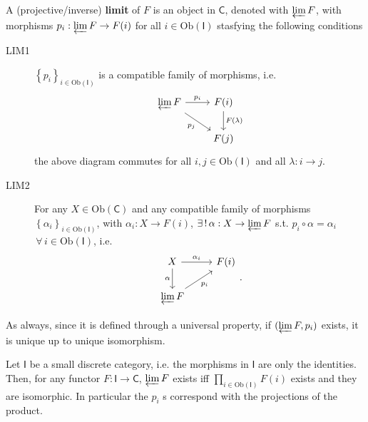 \begin{defn}
	A (projective/inverse) \textbf{limit} of $F$ is an object in $\mathsf{C}$, denoted with $\varprojlim F$, with morphisms
	$p_i: \varprojlim F \to F(i)$ for all $i \in \mathrm{Ob} \left(\mathsf{I}\right)$ stasfying the following conditions
	\begin{description}
		\item[LIM1] $\left\{ p_i \right\}_{i \in \mathrm{Ob} \left(\mathsf{I}\right)}$ is a compatible family of morphisms, i.e.
			\begin{equation}
			\begin{tikzcd}
				\varprojlim F \arrow[r, "p_i", rightarrow] \arrow[rd, "p_j"', rightarrow] &
				F(i) \arrow[d, "F(\lambda)", rightarrow] \\
				&
				F(j)
			\end{tikzcd}
			\end{equation} 
			the above diagram commutes for all $i, j \in \mathrm{Ob} \left(\mathsf{I}\right)$ and all $\lambda: i \to j$.
		\item[LIM2] For any $X \in \mathrm{Ob} \left(\mathsf{C}\right)$ and any compatible family of morphisms $\left\{ \alpha_i \right\}_{i \in \mathrm{Ob} \left(\mathsf{I}\right)}$, with $\alpha_i: X \to F(i)$, 
			$\exists\, !\, \alpha: X \to \varprojlim F$ s.t. $p_i \circ \alpha = \alpha_i$ $\,\forall\, i \in \mathrm{Ob} \left(\mathsf{I}\right)$, i.e.
			\begin{equation}
			\begin{tikzcd}
				X \arrow[r, "\alpha_i", rightarrow] \arrow[d, "\alpha"', rightarrow] &
				F(i)\\
				\varprojlim F \arrow[ru, "p_i"', rightarrow]  
			\end{tikzcd}
			.\end{equation} 
	\end{description} 
\end{defn}

\begin{rem}
	As always, since it is defined through a universal property, if $(\varprojlim F, p_i)$ exists, it is unique up to unique isomorphism.
\end{rem}

\begin{ex}
	Let $\mathsf{I}$ be a small discrete category, i.e. the morphisms in $\mathsf{I}$ are only the identities.
	Then, for any functor $F: \mathsf{I} \to \mathsf{C}$, $\varprojlim F$ exists iff 
	$\prod_{i \in \mathrm{Ob} \left(\mathsf{I}\right)} F(i)$ exists and they are isomorphic.
	In particular the $p_i$ s correspond with the projections of the product.
\end{ex} 

